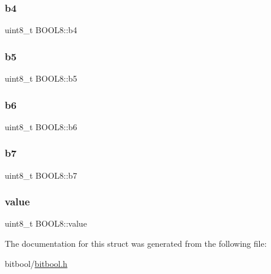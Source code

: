 \hypertarget{struct_b_o_o_l8_a35fb9d62b5bd70f8bf4c4caf0bc48624}{}\label{struct_b_o_o_l8_a35fb9d62b5bd70f8bf4c4caf0bc48624} 
\subsubsection{\texorpdfstring{b4}{b4}}
{\footnotesize\ttfamily uint8\+\_\+t B\+O\+O\+L8\+::b4}

\hypertarget{struct_b_o_o_l8_a39278ea0628859d4dd54764b6c086d51}{}\label{struct_b_o_o_l8_a39278ea0628859d4dd54764b6c086d51} 
\subsubsection{\texorpdfstring{b5}{b5}}
{\footnotesize\ttfamily uint8\+\_\+t B\+O\+O\+L8\+::b5}

\hypertarget{struct_b_o_o_l8_a8e2e1da9c87724e0ae7df2b5c423e232}{}\label{struct_b_o_o_l8_a8e2e1da9c87724e0ae7df2b5c423e232} 
\subsubsection{\texorpdfstring{b6}{b6}}
{\footnotesize\ttfamily uint8\+\_\+t B\+O\+O\+L8\+::b6}

\hypertarget{struct_b_o_o_l8_a64c85814c094ff655b3c9c4a48e9c8be}{}\label{struct_b_o_o_l8_a64c85814c094ff655b3c9c4a48e9c8be} 
\subsubsection{\texorpdfstring{b7}{b7}}
{\footnotesize\ttfamily uint8\+\_\+t B\+O\+O\+L8\+::b7}

\hypertarget{struct_b_o_o_l8_a9228545764df2a5470d6d108173f66bf}{}\label{struct_b_o_o_l8_a9228545764df2a5470d6d108173f66bf} 
\subsubsection{\texorpdfstring{value}{value}}
{\footnotesize\ttfamily uint8\+\_\+t B\+O\+O\+L8\+::value}



The documentation for this struct was generated from the following file\+:\begin{DoxyCompactItemize}
\item 
bitbool/\hyperlink{bitbool_8h}{bitbool.\+h}\end{DoxyCompactItemize}
